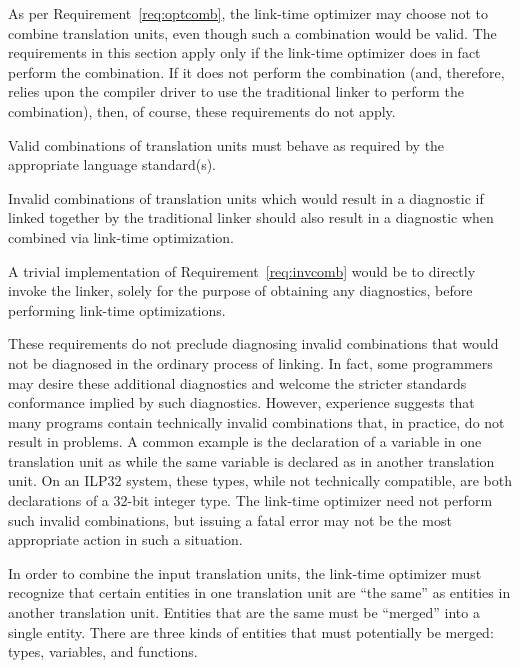 \begin{note}
 As per Requirement~\ref{req:optcomb}, the link-time optimizer may
 choose not to combine translation units, even though such a
 combination would be valid.  The requirements in this section apply
 only if the link-time optimizer does in fact perform the
 combination.  If it does not perform the combination (and, therefore,
 relies upon the compiler driver to use the traditional linker to
 perform the combination), then, of course, these requirements do not
 apply.
\end{note}

\begin{requirement}
  Valid combinations of translation units must behave as required
  by the appropriate language standard(s).
\end{requirement}

\begin{requirement}
\label{req:invcomb}
  Invalid combinations of translation units which would result in a
  diagnostic if linked together by the traditional linker should also
  result in a diagnostic when combined via link-time optimization.
\end{requirement}

\begin{note}
A trivial implementation of Requirement~\ref{req:invcomb}
would be to directly invoke the linker, solely for the purpose of
obtaining any diagnostics, before performing link-time optimizations. 

These requirements do not preclude diagnosing invalid combinations
that would not be diagnosed in the ordinary process of linking.  In
fact, some programmers may desire these additional diagnostics and
welcome the stricter standards conformance implied by such
diagnostics.  However, experience suggests that many programs contain
technically invalid combinations that, in practice, do not result in
problems.  A common example is the declaration of a variable in one
translation unit as  while the same variable is declared as
 in another translation unit.  On an ILP32 system, these
types, while not technically compatible, are both declarations of a
32-bit integer type.  The link-time optimizer need not perform such
invalid combinations, but issuing a fatal error may not be the most
appropriate action in such a situation.
\end{note}

In order to combine the input translation units, the link-time
optimizer must recognize that certain entities in one translation unit
are ``the same'' as entities in another translation unit.  Entities
that are the same must be ``merged'' into a single entity.  There are
three kinds of entities that must potentially be merged: types,
variables, and functions.

